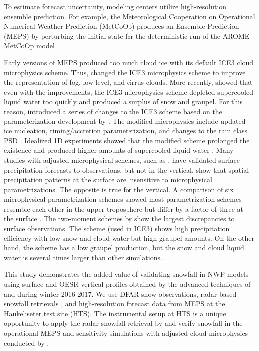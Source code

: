 \documentclass{ametsocV5}
\begin{document}
    To estimate forecast uncertainty, modeling centers utilize high-resolution ensemble prediction. For example, the Meteorological Cooperation on Operational Numerical Weather Prediction (MetCoOp) produces an Ensemble Prediction (MEPS) by perturbing the initial state for the deterministic run of the  AROME-MetCoOp model \citep[AROME-Applications of Research to Operations at Mesoscale;][]{frogner_convection-permitting_2019}. 
    
    Early versions of MEPS produced too much cloud ice with its default ICE3 cloud microphysics scheme. Thus, \citet{muller_arome-metcoop:_2017} changed the ICE3 microphysics scheme to improve the representation of fog, low-level, and cirrus clouds. More recently, \citet{engdahl_improving_2020} showed that even with the improvements, the ICE3 microphysics scheme depleted supercooled liquid water too quickly and produced a surplus of snow and graupel. For this reason, \citet{engdahl_improving_2020} introduced a series of changes to the ICE3 scheme based on the parameterization development by \citet{thompson_explicit_2004,thompson_explicit_2008}. The modified microphysics include updated ice nucleation, riming/accretion parameterization, and changes to the rain class PSD \citep{engdahl_improving_2020}. Idealized 1D experiments showed that the modified scheme prolonged the existence and produced higher amounts of supercooled liquid water \citep{engdahl_improving_2020}. Many studies with adjusted microphysical schemes, such as \citet{liu_high-resolution_2011}, have validated surface precipitation forecasts to observations, but not in the vertical. \citet{liu_high-resolution_2011} show that spatial precipitation patterns at the surface are insensitive to microphysical parametrizations. The opposite is true for the vertical. A comparison of six microphysical parametrization schemes showed most parametrization schemes resemble each other in the upper troposphere but differ by a factor of three at the surface \citep{liu_high-resolution_2011}. The two-moment schemes by \citet{lin_bulk_1983,morrison_impact_2009} show the largest discrepancies to surface observations. The \citet{lin_bulk_1983} scheme (used in ICE3) shows high precipitation efficiency with low snow and cloud water but high graupel amounts. On the other hand, the \citet{morrison_impact_2009} scheme has a low graupel production, but the snow and cloud liquid water is several times larger than other simulations. 
    

    
    This study demonstrates the added value of validating snowfall in NWP models using surface and OESR vertical profiles obtained by the advanced techniques of \citet{cooper_variational_2017} and \citet{schirle_estimation_2019} during winter 2016-2017. We use DFAR snow observations, radar-based snowfall retrievals \citep{cooper_variational_2017,schirle_estimation_2019}, and high-resolution forecast data from MEPS at the Haukeliseter test site (HTS). The instrumental setup at HTS is a unique opportunity to apply the radar snowfall retrieval by \citet{schirle_estimation_2019} and verify snowfall in the operational MEPS and sensitivity simulations with adjusted cloud microphysics conducted by \citet{engdahl_effects_2020}.
    
\end{document}
